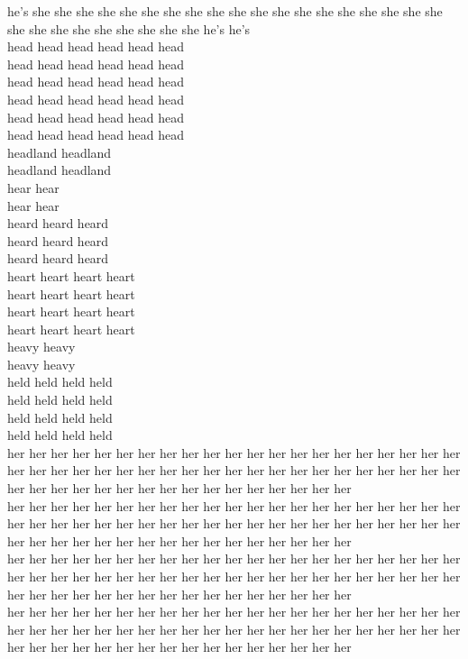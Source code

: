 he's she she she she she she she she she she she she she she she she she she she she she she she she she she she she he's he's\\
head head head head head head\\
head head head head head head\\
head head head head head head\\
head head head head head head\\
head head head head head head\\
head head head head head head\\
headland headland\\
headland headland\\
hear hear\\
hear hear\\
heard heard heard\\
heard heard heard\\
heard heard heard\\
heart heart heart heart\\
heart heart heart heart\\
heart heart heart heart\\
heart heart heart heart\\
heavy heavy\\
heavy heavy\\
held held held held\\
held held held held\\
held held held held\\
held held held held\\
her her her her her her her her her her her her her her her her her her her her her her her her her her her her her her her her her her her her her her her her her her her her her her her her her her her her her her her her her her\\
her her her her her her her her her her her her her her her her her her her her her her her her her her her her her her her her her her her her her her her her her her her her her her her her her her her her her her her her her her\\
her her her her her her her her her her her her her her her her her her her her her her her her her her her her her her her her her her her her her her her her her her her her her her her her her her her her her her her her her her\\
her her her her her her her her her her her her her her her her her her her her her her her her her her her her her her her her her her her her her her her her her her her her her her her her her her her her her her her her her her\\
